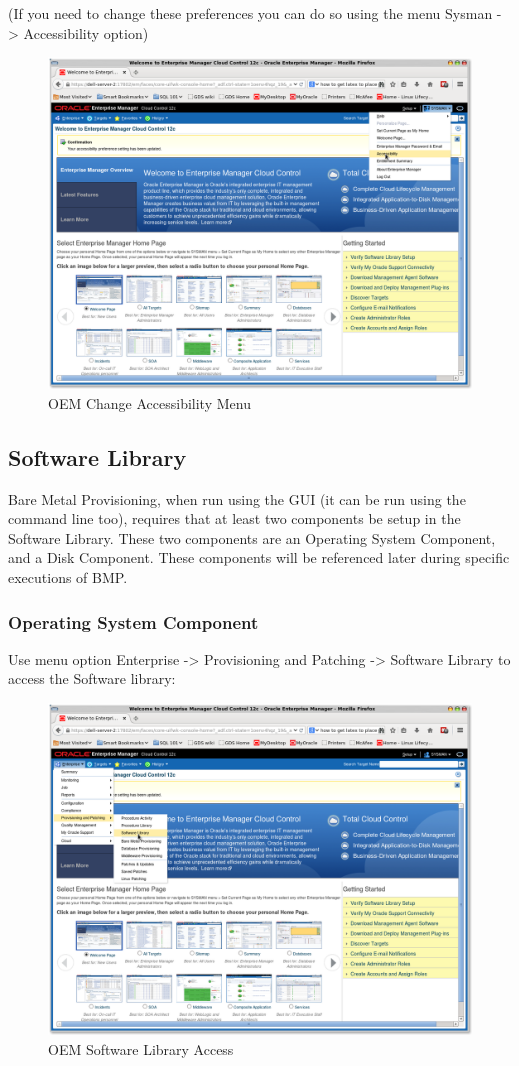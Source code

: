 \documentclass[11pt]{article}
\begin{document}
\clearpage
(If you need to change these preferences you can do so using the menu Sysman -> Accessibility option)
\begin{figure}[htb]
\centering
\includegraphics[width=.9\linewidth]{images/OEM_Change_Accessibility.png}
\caption{OEM Change Accessibility Menu}
\end{figure}
\clearpage
\subsection{Software Library}
\label{sec-4-3}
Bare Metal Provisioning, when run using the GUI (it can be run using the command line too), requires that at least two components be setup in the Software Library. These two components are an Operating System Component, and a Disk Component. These components will be referenced later during specific executions of BMP.
\subsubsection{Operating System Component}
\label{sec-4-3-1}
Use menu option Enterprise -> Provisioning and Patching -> Software Library to access the Software library:
\begin{figure}[htb]
\centering
\includegraphics[width=.9\linewidth]{images/OEM_Software_Library_Access.png}
\caption{OEM Software Library Access}
\end{figure}
\end{document}
